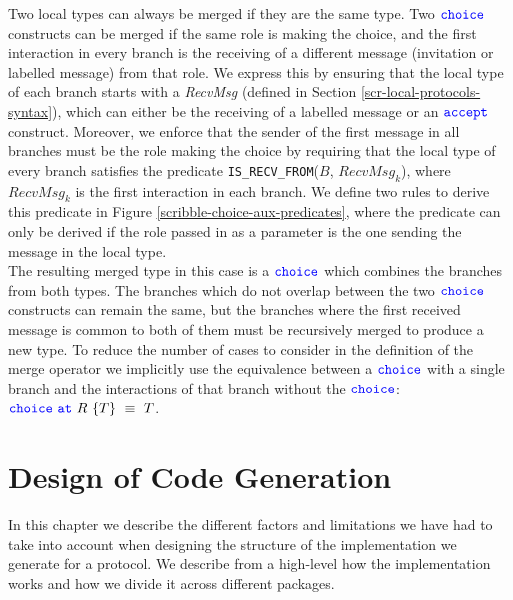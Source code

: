 \documentclass[12pt,twoside]{report}
\begin{document}
Two local types can always be merged if they are the same type. Two ${\color{blue}\mathtt{choice}}$ constructs can be merged if the same role is making the choice, and the first interaction in every branch is the receiving of a different message (invitation or labelled message) from that role. We express this by ensuring that the local type of each branch starts with a \textit{RecvMsg} (defined in Section \ref{scr-local-protocols-syntax}), which can either be the receiving of a labelled message or an ${\color{blue}\mathtt{accept}}$ construct. Moreover, we enforce that the sender of the first message in all branches must be the role making the choice by requiring that the local type of every branch satisfies the predicate \texttt{IS\_RECV\_FROM}($\mathit{B}$, $\mathit{RecvMsg_k}$), where $\mathit{RecvMsg_k}$ is the first interaction in each branch. We define two rules to derive this predicate in Figure \ref{scribble-choice-aux-predicates}, where the predicate can only be derived if the role passed in as a parameter is the one sending the message in the local type.\\

The resulting merged type in this case is a ${\color{blue}\mathtt{choice}}$ which combines the branches from both types. The branches which do not overlap between the two ${\color{blue}\mathtt{choice}}$ constructs can remain the same, but the branches where the first received message is common to both of them must be recursively merged to produce a new type. To reduce the number of cases to consider in the definition of the merge operator we implicitly use the equivalence between a ${\color{blue}\mathtt{choice}}$ with a single branch and the interactions of that branch without the ${\color{blue}\mathtt{choice}}$: ${\color{blue}\mathtt{choice}}\ {\color{blue}\mathtt{at}}\ R\ \{T\}\ \equiv\ T$.\\
 
\chapter{Design of Code Generation}\label{codegen-scheme-design}
In this chapter we describe the different factors and limitations we have had to take into account when designing the structure of the implementation we generate for a protocol. We describe from a high-level how the implementation works and how we divide it across different packages. 

\end{document}
